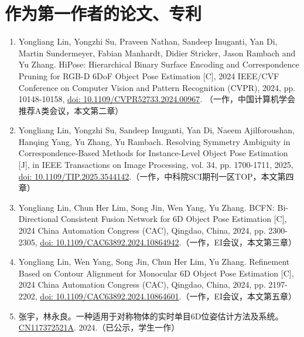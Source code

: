 \cleardoublepage
{}

\section*{作为第一作者的论文、专利}

\begin{sloppypar}  %

\begin{enumerate}
    \item Yongliang Lin, Yongzhi Su, Praveen Nathan, Sandeep Inuganti, Yan Di, Martin Sundermeyer, Fabian Manhardt, Didier Stricker, Jason Rambach and Yu Zhang. HiPose: Hierarchical Binary Surface Encoding and Correspondence Pruning for RGB-D 6DoF Object Pose Estimation [C], 2024 IEEE/CVF Conference on Computer Vision and Pattern Recognition (CVPR), 2024, pp. 10148-10158, \href{https://doi.org/10.1109/CVPR52733.2024.00967}{doi: 10.1109/CVPR52733.2024.00967}. （一作，中国计算机学会推荐A类会议，本文第二章）
    \item Yongliang Lin, Yongzhi Su, Sandeep Inuganti, Yan Di, Naeem Ajilforoushan, Hanqing Yang, Yu Zhang, Yu Rambach. Resolving Symmetry Ambiguity in Correspondence-Based Methods for Instance-Level Object Pose Estimation [J], in IEEE Transactions on Image Processing, vol. 34, pp. 1700-1711, 2025, \href{https://doi.org/10.1109/TIP.2025.3544142}{doi: 10.1109/TIP.2025.3544142}.（一作，中科院SCI期刊一区TOP，本文第四章）
    \item Yongliang Lin, Chun Her Lim, Song Jin, Wen Yang, Yu Zhang. BCFN: Bi-Directional Consistent Fusion Network for 6D Object Pose Estimation [C], 2024 China Automation Congress (CAC), Qingdao, China, 2024, pp. 2300-2305, \href{https://doi.org/10.1109/CAC63892.2024.10864942}{doi: 10.1109/CAC63892.2024.10864942}.（一作，EI会议，本文第三章）
    \item Yongliang Lin, Wen Yang, Song Jin, Chun Her Lim, Yu Zhang. Refinement Based on Contour Alignment for Monocular 6D Object Pose Estimation [C], 2024 China Automation Congress (CAC), Qingdao, China, 2024, pp. 2197-2202, \href{https://doi.org/10.1109/CAC63892.2024.10864601}{doi: 10.1109/CAC63892.2024.10864601}.（一作，EI会议，本文第五章）
    \item 张宇，林永良。一种适用于对称物体的实时单目6D位姿估计方法及系统。\href{https://patents.google.com/patent/CN117372521A}{CN117372521A}. 2024.（已公示，学生一作）
\end{enumerate}


\end{sloppypar}
